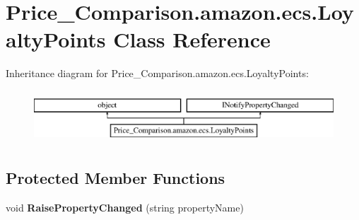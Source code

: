 \hypertarget{class_price___comparison_1_1amazon_1_1ecs_1_1_loyalty_points}{\section{Price\-\_\-\-Comparison.\-amazon.\-ecs.\-Loyalty\-Points Class Reference}
\label{class_price___comparison_1_1amazon_1_1ecs_1_1_loyalty_points}
}


 


Inheritance diagram for Price\-\_\-\-Comparison.\-amazon.\-ecs.\-Loyalty\-Points\-:\begin{figure}[H]
\begin{center}
\leavevmode
\includegraphics[height=2.000000cm]{class_price___comparison_1_1amazon_1_1ecs_1_1_loyalty_points}
\end{center}
\end{figure}
\subsection*{Protected Member Functions}
\begin{DoxyCompactItemize}
\item 
\hypertarget{class_price___comparison_1_1amazon_1_1ecs_1_1_loyalty_points_a4ea398f51bb68a94c8a12d88d4692ce2}{void {\bfseries Raise\-Property\-Changed} (string property\-Name)}\label{class_price___comparison_1_1amazon_1_1ecs_1_1_loyalty_points_a4ea398f51bb68a94c8a12d88d4692ce2}

\end{DoxyCompactItemize}
